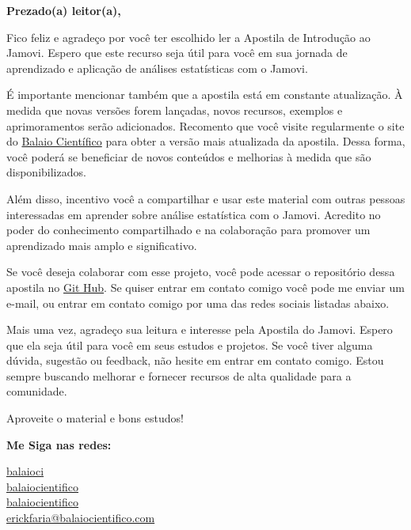 \begin{flushleft}
\Huge\textbf{Prezado(a) leitor(a),}
\end{flushleft}

Fico feliz e agradeço por você ter escolhido ler a Apostila de Introdução ao Jamovi. Espero que este recurso seja útil para você em sua jornada de aprendizado e aplicação de análises estatísticas com o Jamovi.

É importante mencionar também que a apostila está em constante atualização. À medida que novas versões forem lançadas, novos recursos, exemplos e aprimoramentos serão adicionados. Recomento que você visite regularmente o site do \href{https://www.balaiocientifico.com/jamovi/apostila-de-jamovi/} {Balaio Científico} para obter a versão mais atualizada da apostila. Dessa forma, você poderá se beneficiar de novos conteúdos e melhorias à medida que são disponibilizados.

Além disso, incentivo você a compartilhar e usar este material com outras pessoas interessadas em aprender sobre análise estatística com o Jamovi. Acredito no poder do conhecimento compartilhado e na colaboração para promover um aprendizado mais amplo e significativo.

Se você deseja colaborar com esse projeto, você pode acessar o repositório dessa apostila no \href{https://github.com/balaio-cientifico/apostila_jamovi}{Git Hub}. Se quiser entrar em contato comigo você pode me enviar um e-mail, ou entrar em contato comigo por uma das redes sociais listadas abaixo.

Mais uma vez, agradeço sua leitura e interesse pela Apostila do Jamovi. Espero que ela seja útil para você em seus estudos e projetos. Se você tiver alguma dúvida, sugestão ou feedback, não hesite em entrar em contato comigo. Estou sempre buscando melhorar e fornecer recursos de alta qualidade para a comunidade.

Aproveite o material e bons estudos!

\vfill

\noindent \textbf{Me Siga nas redes:}

\noindent \faTwitter{} \href{https://twitter.com/balaioci}{balaioci} \\
\faFacebook{} \href{https://www.facebook.com/balaiocientifico/}{balaiocientifico} \\
\faInstagram{} \href{https://www.instagram.com/balaiocientifico/}{balaiocientifico} \\
\faEnvelope{} \href{mailto:erickfaria@balaiocientifico.com}{erickfaria@balaiocientifico.com}\\

